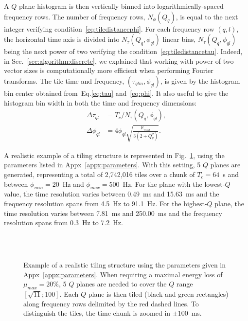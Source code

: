 A $Q$ plane histogram is then vertically binned into logarithmically-spaced frequency rows. The number of frequency rows, $N_\phi(Q_q)$, is equal to the next integer verifying condition~\ref{eq:tiledistancephi}. For each frequency row $(q,l)$, the horizontal time axis is divided into $N_\tau(Q_q,\phi_{ql})$ linear bins, $N_\tau(Q_q,\phi_{ql})$ being the next power of two verifying the condition~\ref{eq:tiledistancetau}. Indeed, in Sec.~\ref{sec:algorithm:discrete}, we explained that working with power-of-two vector sizes is computationally more efficient when performing Fourier transforms. The tile time and frequency, $(\tau_{qlm}, \phi_{ql})$, is given by the histogram bin center obtained from~Eq.\ref{eq:tau} and~\ref{eq:phi}. It also useful to give the histogram bin width in both the time and frequency dimensions:
\begin{align}
  \Delta\tau_{ql} &= T_c / N_\tau(Q_q, \phi_{ql}), \label{eq:dtau} \\
  \Delta\phi_{ql} &= 4\phi_{ql}\sqrt{\frac{\mu_{max}}{3(2+Q_q^2)}}.\label{eq:dphi}
\end{align}

A realistic example of a tiling structure is represented in Fig.~\ref{fig:tiling}, using the parameters listed in Appx~\ref{appx:parameters}. With this setting, 5 $Q$ planes are generated, representing a total of 2,742,016 tiles over a chunk of $T_c=64$~s and between $\phi_{min}=20$~Hz and $\phi_{max}=500$~Hz. For the plane with the lowest-$Q$ value, the time resolution varies between 0.49~ms and 15.63~ms and the frequency resolution spans from 4.5~Hz to 91.1~Hz. For the highest-$Q$ plane, the time resolution varies between 7.81~ms and 250.00~ms and the frequency resolution spans from 0.3~Hz to 7.2~Hz.
\begin{figure}
  \center
    \\
    \\
  \caption{Example of a realistic tiling structure using the parameters given in Appx~\ref{appx:parameters}. When requiring a maximal energy loss of $\mu_{max}=20\%$, 5 $Q$ planes are needed to cover the $Q$ range $[\sqrt{11}; 100]$. Each $Q$ plane is then tiled (black and green rectangles) along frequency rows delimited by the red dashed lines. To distinguish the tiles, the time chunk is zoomed in $\pm 100$~ms.}
  \label{fig:tiling}
\end{figure}

